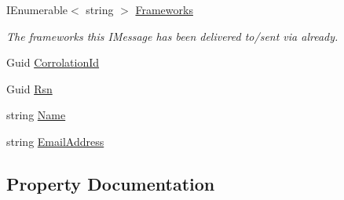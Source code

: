 \begin{DoxyCompactItemize}
I\+Enumerable$<$ string $>$ \hyperlink{classCqrs_1_1WebApi_1_1HelpPageConfig_1_1UserCreatedEvent_aaccd19bfc417660ef3560b5f2742b5a1_aaccd19bfc417660ef3560b5f2742b5a1}{Frameworks}
\begin{DoxyCompactList}\small\item\em The frameworks this I\+Message has been delivered to/sent via already. \end{DoxyCompactList}\item 
Guid \hyperlink{classCqrs_1_1WebApi_1_1HelpPageConfig_1_1UserCreatedEvent_a0ab24970f81c4dce729609f2c9afec3b_a0ab24970f81c4dce729609f2c9afec3b}{Corrolation\+Id}
\item 
Guid \hyperlink{classCqrs_1_1WebApi_1_1HelpPageConfig_1_1UserCreatedEvent_a8bf0fee0f939dfcdc81f402ba0e07c22_a8bf0fee0f939dfcdc81f402ba0e07c22}{Rsn}
\item 
string \hyperlink{classCqrs_1_1WebApi_1_1HelpPageConfig_1_1UserCreatedEvent_a528ebdf311a769ae18fea4e8a155998f_a528ebdf311a769ae18fea4e8a155998f}{Name}
\item 
string \hyperlink{classCqrs_1_1WebApi_1_1HelpPageConfig_1_1UserCreatedEvent_a67b06cda1fda4cd45f659da08600a142_a67b06cda1fda4cd45f659da08600a142}{Email\+Address}
\end{DoxyCompactItemize}


\subsection{Property Documentation}
\mbox{\label{classCqrs_1_1WebApi_1_1HelpPageConfig_1_1UserCreatedEvent_a02e51969b7b6c8af4790757dc26cc480_a02e51969b7b6c8af4790757dc26cc480}} 
